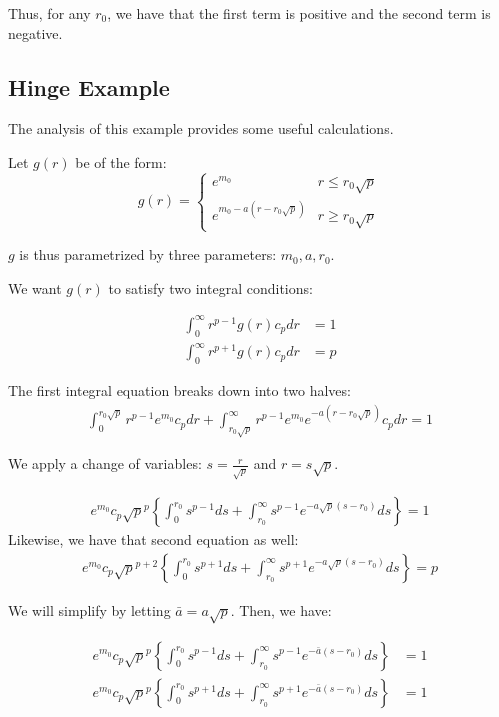 \documentclass{article}
\begin{document}
Thus, for any $r_0$, we have that the first term is positive and the second term is negative. 

\subsection{Hinge Example}


The analysis of this example provides some useful calculations.

Let $g(r)$ be of the form:
\[
g(r) = \left\{ \begin{array}{ll}
       e^{m_0} & r \leq r_0 \sqrt{p} \\
    e^{m_0 - a(r - r_0\sqrt{p})} & r \geq r_0 \sqrt{p} 
          \end{array} \right.
\]

$g$ is thus parametrized by three parameters: $m_0, a, r_0$.

We want $g(r)$ to satisfy two integral conditions:

\begin{align*}
\int_0^\infty r^{p-1} g(r) c_p dr &= 1 \\
\int_0^\infty r^{p+1} g(r) c_p dr &= p 
\end{align*}

The first integral equation breaks down into two halves:
\begin{align*}
\int_0^{r_0 \sqrt{p}} r^{p-1} e^{m_0} c_p dr + \int_{r_0 \sqrt{p}}^\infty r^{p-1} e^{m_0} e^{-a ( r - r_0 \sqrt{p} )} c_p dr = 1
\end{align*}

We apply a change of variables: $s = \frac{r}{\sqrt{p}}$ and $r = s\sqrt{p}$. 

\begin{align*}
e^{m_0} c_p \sqrt{p}^p \left\{
   \int_0^{r_0} s^{p-1} ds + \int_{r_0}^\infty s^{p-1} e^{- a \sqrt{p}(s - r_0)}  ds  \right\} = 1
\end{align*}
Likewise, we have that second equation as well:
\begin{align*}
e^{m_0} c_p \sqrt{p}^{p+2} \left\{
   \int_0^{r_0} s^{p+1} ds + \int_{r_0}^\infty s^{p+1} e^{- a \sqrt{p}(s - r_0)}  ds  \right\} = p
\end{align*}

We will simplify by letting $\bar{a} = a \sqrt{p}$. Then, we have:

\begin{align*}
e^{m_0} c_p \sqrt{p}^p \left\{
   \int_0^{r_0} s^{p-1} ds + \int_{r_0}^\infty s^{p-1} e^{- \bar{a} (s - r_0)}  ds  \right\} &= 1 \\
e^{m_0} c_p \sqrt{p}^p \left\{
   \int_0^{r_0} s^{p+1} ds + \int_{r_0}^\infty s^{p+1} e^{- \bar{a} (s - r_0)}  ds  \right\} &= 1
\end{align*}
\end{document}
